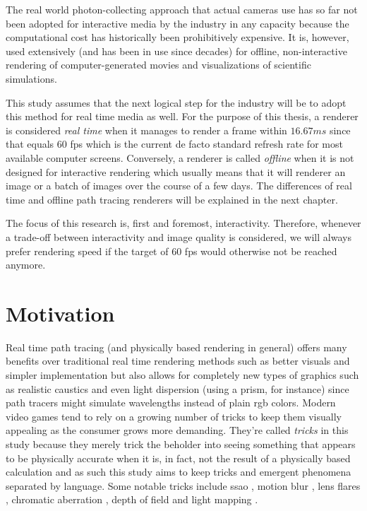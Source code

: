 \documentclass[
  twoside,
  11pt, a4paper,
  footinclude=true,
  headinclude=true,
  cleardoublepage=empty
]{scrreprt}
\begin{document}
The real world photon-collecting approach that actual cameras use has so far not been adopted for
interactive media by the industry in any capacity because the computational cost has historically
been prohibitively expensive. It is, however, used extensively (and has been in use since decades)
for offline, non-interactive rendering of computer-generated movies and visualizations of
scientific simulations.

This study assumes that the next logical step for the industry will be to adopt this method for
real time media as well. For the purpose of this thesis, a renderer is considered
\textit{real time} when it manages to render a frame within \(16.67ms\) since that equals 60
\ac{fps} which is
the current de facto standard refresh rate for most available computer screens. Conversely, a
renderer is called \textit{offline} when it is not designed for interactive rendering which usually
means that it will renderer an image or a batch of images over the course of a few days. The
differences of real time and offline path tracing renderers will be explained in the next chapter.

The focus of this research is, first and foremost, interactivity. Therefore, whenever a trade-off between
interactivity and image quality is considered, we will always prefer rendering speed if the target
of 60 \ac{fps} would otherwise not be reached anymore.

\section{Motivation}
Real time path tracing (and physically based rendering in general) offers many
benefits over traditional real time rendering methods such as better visuals
and simpler implementation but also allows for completely new types of graphics
such as realistic caustics \cite{wiki:caustics} and even light dispersion
\cite{wiki:dispersion} (using a prism, for instance) since path tracers might simulate wavelengths
instead of plain \ac{rgb} colors. Modern video games tend
to rely on a growing number of tricks to keep them visually appealing as the
consumer grows more demanding. They're called \textit{tricks} in this study
because they merely trick the beholder into seeing something that appears to be
physically accurate when it is, in fact, not the result of a physically based
calculation and as such this study aims to keep tricks and emergent phenomena
separated by language. Some notable tricks include \ac{ssao}
\cite{wiki:ssao}, motion blur \cite{wiki:motion-blur}, lens flares
\cite{wiki:lens-flare}, chromatic aberration \cite{wiki:chromatic-aberration},
depth of field \cite{wiki:depth-of-field} and light mapping \cite{wiki:lightmap}.
\end{document}
